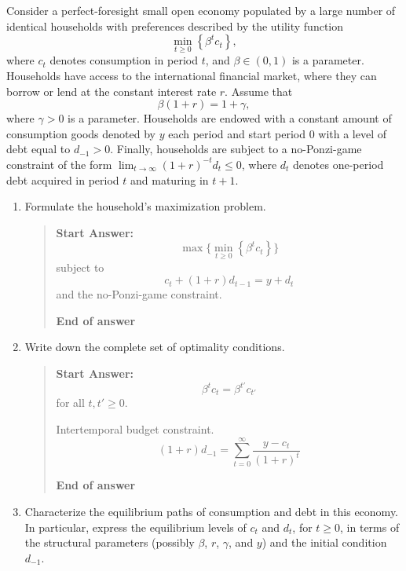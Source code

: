 \begin{exercise}
Consider a perfect-foresight small open economy populated by a large number of identical households with preferences described by the utility
function
\[
 \min_{t\ge0} 
\left\{\beta^tc_t\right\},
\]
where  $c_t$ denotes consumption in period $t$,  and $\beta\in(0,1)$ is a parameter. 
 Households have access to the international financial market, where they can borrow or lend at the constant interest rate $r$. Assume that 
\[
\beta(1+r)=1+\gamma,
\]
where $\gamma>0$ is a parameter.  Households are endowed with a constant amount of  consumption goods denoted   by $y$ each period  and  start period 0 with a level of debt
equal to  $d_{-1}>0$.  
Finally, 
households are subject to a  no-Ponzi-game constraint of the form $\lim_{t\rightarrow\infty}(1+r)^{-t}d_t\le 0$, where $d_t$ denotes 
one-period debt  acquired in period $t$ and maturing in $t+1$. 
\begin{enumerate}
\item Formulate the household's maximization problem. 

\begin{quote}
{\bf Start Answer: } 
\[
\max\{ \min_{t\ge0} 
\left\{\beta^tc_t\right\}
\}
\]
subject to 
\[
c_t + (1+r) d_{t-1}  = y + d_t
\]
and the no-Ponzi-game constraint.

{\bf End of answer}
\end{quote}
\item Write down the complete set of optimality conditions. 
\begin{quote}
{\bf Start Answer: } 
\[
\beta^tc_t = \beta^{t'} c_{t'}
\]
for all $t, t'\ge 0$. 

Intertemporal budget constraint. 
\[
 (1+r) d_{-1} = \sum_{t=0}^{\infty} 
\frac{
y-c_t
}
{(1+r)^t}
\]

{\bf End of answer}

\end{quote}

\item Characterize the equilibrium paths of consumption and debt in this economy. 
In particular, express the equilibrium levels of  $c_t$ and $d_t$, for $t\ge0$, in terms of the structural parameters (possibly $\beta$, $r$, $\gamma$, and $y$)  and  the initial condition $d_{-1}$. 



\end{enumerate}
\end{exercise}
